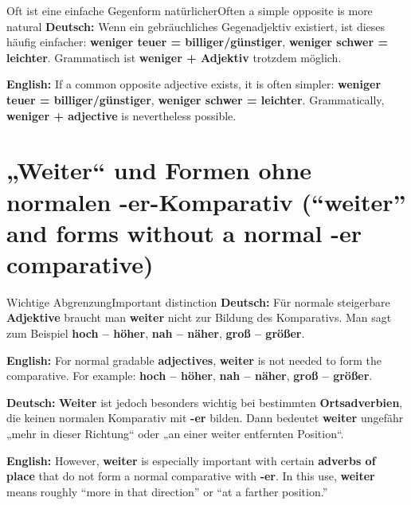 \documentclass[a4paper,11pt]{article}
\newcommand{\GermanText}[1]{\textbf{Deutsch: }#1\par}
\newcommand{\EnglishText}[1]{{\small\color{SoftGray}\textbf{English: }#1\par}}
\begin{document}
      \begin{grammarentry}{Oft ist eine einfache Gegenform natürlicher}{Often a simple opposite is more natural}
         \GermanText{Wenn ein gebräuchliches Gegenadjektiv existiert, ist dieses häufig einfacher: \textbf{weniger teuer = billiger/günstiger}, \textbf{weniger schwer = leichter}. Grammatisch ist \textbf{weniger + Adjektiv} trotzdem möglich.}
         \EnglishText{If a common opposite adjective exists, it is often simpler: \textbf{weniger teuer = billiger/günstiger}, \textbf{weniger schwer = leichter}. Grammatically, \textbf{weniger + adjective} is nevertheless possible.}
      \end{grammarentry}

   \section{„Weiter“ und Formen ohne normalen -er-Komparativ \textnormal{(“weiter” and forms without a normal -er comparative)}}

      \begin{grammarentry}{Wichtige Abgrenzung}{Important distinction}
         \GermanText{Für normale steigerbare \textbf{Adjektive} braucht man \textbf{weiter} nicht zur Bildung des Komparativs. Man sagt zum Beispiel \textbf{hoch -- höher}, \textbf{nah -- näher}, \textbf{groß -- größer}.}
         \EnglishText{For normal gradable \textbf{adjectives}, \textbf{weiter} is not needed to form the comparative. For example: \textbf{hoch -- höher}, \textbf{nah -- näher}, \textbf{groß -- größer}.}

         \GermanText{\textbf{Weiter} ist jedoch besonders wichtig bei bestimmten \textbf{Ortsadverbien}, die keinen normalen Komparativ mit \textbf{-er} bilden. Dann bedeutet \textbf{weiter} ungefähr „mehr in dieser Richtung“ oder „an einer weiter entfernten Position“.}
         \EnglishText{However, \textbf{weiter} is especially important with certain \textbf{adverbs of place} that do not form a normal comparative with \textbf{-er}. In this use, \textbf{weiter} means roughly “more in that direction” or “at a farther position.”}
      \end{grammarentry}
\end{document}
